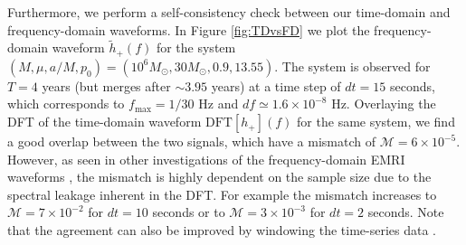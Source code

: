 \documentclass[%
 reprint,
 nofootinbib,
 amsmath,amssymb,
 aps,
 prd,
]{revtex4-2}
\begin{document}
Furthermore, we perform a self-consistency check between our time-domain and frequency-domain waveforms. In Figure \ref{fig:TDvsFD} we plot the frequency-domain waveform $\tilde{h}_+(f)$ for the system $(M, \mu, a/M, p_0) = (10^6M_\odot, 30 M_\odot, 0.9, 13.55)$. The system is observed for $T=4$ years (but merges after $\sim 3.95$ years) at a time step of $dt=15$ seconds, which corresponds to $f_\mathrm{max} = 1/30$ Hz and $df \simeq 1.6\times 10^{-8}$ Hz. Overlaying the DFT of the time-domain waveform $\mathrm{DFT}[h_+](f)$ for the same system, we find a good overlap between the two signals, which have a mismatch of $\mathcal{M} = 6\times 10^{-5}$. However, as seen in other investigations of the frequency-domain EMRI waveforms \cite{SperETC23}, the mismatch is highly dependent on the sample size due to the spectral leakage inherent in the DFT. For example the mismatch increases to $\mathcal{M} = 7\times 10^{-2}$ for $dt=10$ seconds or to $\mathcal{M} = 3\times 10^{-3}$ for $dt=2$ seconds. Note that the agreement can also be improved by windowing the time-series data \cite{SperETC23}.





\end{document}
